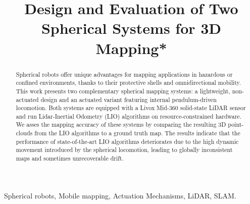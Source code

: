 \documentclass[conference]{IEEEtran}
\begin{document}
\title{Design and Evaluation of  Two Spherical Systems for 3D Mapping*\\

}

\author{
}

\maketitle

\begin{abstract}
Spherical robots offer unique advantages for mapping applications in hazardous or confined environments, thanks to their protective shells and omnidirectional mobility. 
This work presents two complementary spherical mapping systems: a lightweight, non-actuated design and an actuated variant featuring internal pendulum-driven locomotion. 
Both systems are equipped with a Livox Mid-360 solid-state LiDAR sensor and run Lidar-Inertial Odometry (LIO) algorithms on resource-constrained hardware. 
We asses the mapping accuracy of these systems by comparing the resulting 3D point-clouds from the LIO algorithms to a ground truth map.
The results indicate that the performance of state-of-the-art LIO algorithms deteriorates due to the high dynamic movement introduced by the spherical locomotion, leading to globally inconsistent maps and sometimes unrecoverable drift.
\end{abstract}

\begin{IEEEkeywords}
Spherical robots, Mobile mapping, Actuation Mechanisms, LiDAR, SLAM.
\end{IEEEkeywords}
\end{document}
